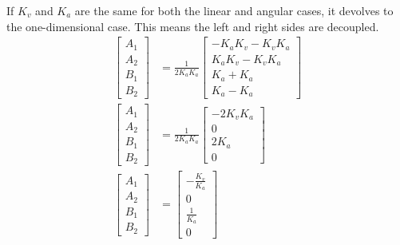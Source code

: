 If $K_v$ and $K_a$ are the same for both the linear and angular cases, it devolves to the one-dimensional case. This means the left and right sides are decoupled.
\begin{align*}
  \begin{bmatrix}
    A_1 \\
    A_2 \\
    B_1 \\
    B_2
  \end{bmatrix} &= \frac{1}{2 K_a K_a}
    \begin{bmatrix}
      -K_a K_v - K_v K_a \\
      K_a K_v - K_v K_a \\
      K_a + K_a \\
      K_a - K_a
    \end{bmatrix} \\
  \begin{bmatrix}
    A_1 \\
    A_2 \\
    B_1 \\
    B_2
  \end{bmatrix} &= \frac{1}{2 K_a K_a}
    \begin{bmatrix}
      -2K_v K_a \\
      0 \\
      2 K_a \\
      0
    \end{bmatrix} \\
  \begin{bmatrix}
    A_1 \\
    A_2 \\
    B_1 \\
    B_2
  \end{bmatrix} &=
    \begin{bmatrix}
      -\frac{K_v}{K_a} \\
      0 \\
      \frac{1}{K_a} \\
      0
    \end{bmatrix}
\end{align*}

